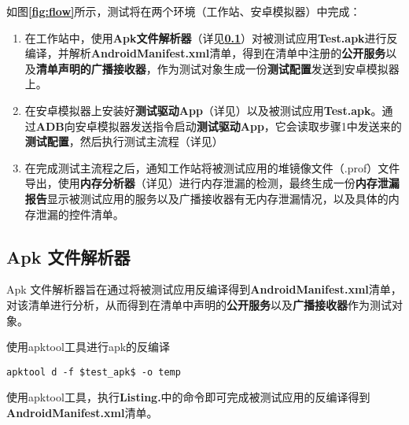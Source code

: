 如图\textbf{\textcolor{red}{\ref{fig:flow}}}所示，测试将在两个环境（工作站、安卓模拟器）中完成：
\begin{enumerate}
	\item 在工作站中，使用\textbf{Apk文件解析器}（详见\textbf{\textcolor{red}{\ref{apk analyser}}}）对被测试应用\textbf{Test.apk}进行反编译，并解析\textbf{AndroidManifest.xml}清单，得到在清单中注册的\textbf{公开服务}以及\textbf{清单声明的广播接收器}，作为测试对象生成一份\textbf{测试配置}发送到安卓模拟器上。
	\item 在安卓模拟器上安装好\textbf{测试驱动App}（详见\redbf{\ref{test driver app}}）以及被测试应用\textbf{Test.apk}。通过\textbf{ADB}向安卓模拟器发送指令启动\textbf{测试驱动App}，它会读取步骤1中发送来的\textbf{测试配置}，然后执行测试主流程（详见\redbf{\ref{main flow}}）
	\item 在完成测试主流程之后，通知工作站将被测试应用的堆镜像文件（.prof）文件导出，使用\textbf{内存分析器}（详见\redbf{\ref{memory analyser}}）进行内存泄漏的检测，最终生成一份\textbf{内存泄漏报告}显示被测试应用的服务以及广播接收器有无内存泄漏情况，以及具体的内存泄漏的控件清单。
\end{enumerate}

\subsection{Apk 文件解析器}\label{apk analyser}
Apk 文件解析器旨在通过将被测试应用反编译得到\textbf{AndroidManifest.xml}清单，对该清单进行分析，从而得到在清单中声明的\textbf{公开服务}以及\textbf{广播接收器}作为测试对象。
\begin{listing}[htbp]
	\centering
	\caption{使用apktool工具进行apk的反编译}
	\begin{verbatim}
apktool d -f $test_apk$ -o temp
	\end{verbatim}
	\label{shell:apktool}
\end{listing}

使用apktool工具\cite{apktool}，执行\textbf{Listing.}\redbf{\ref{shell:apktool}}中的命令即可完成被测试应用的反编译得到\textbf{AndroidManifest.xml}清单。

